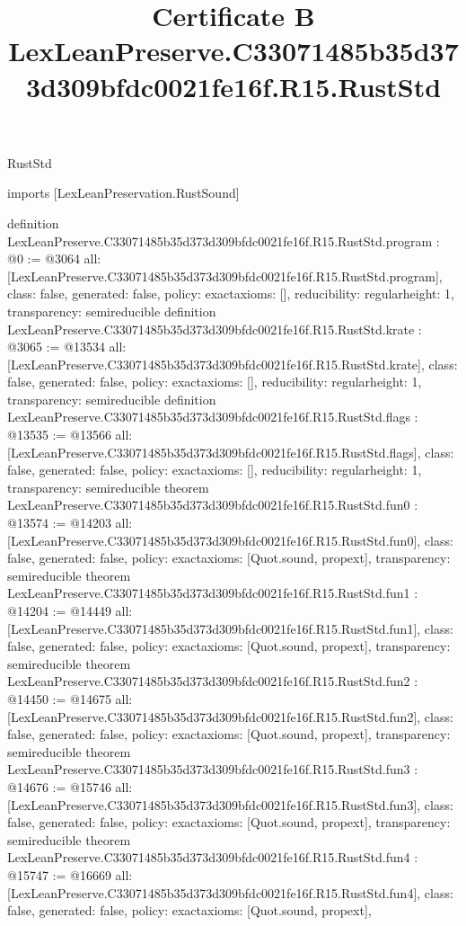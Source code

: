 \begin{lexlean}{RustStd}
\title{Certificate B LexLeanPreserve.C33071485b35d373d309bfdc0021fe16f.R15.RustStd}
\begin{coremodule}
imports [LexLeanPreservation.RustSound]

definition LexLeanPreserve.C33071485b35d373d309bfdc0021fe16f.R15.RustStd.program : @0 := @3064 {
  all: [LexLeanPreserve.C33071485b35d373d309bfdc0021fe16f.R15.RustStd.program],
  class: false,
  generated: false,
  policy: exact{axioms: []},
  reducibility: regular{height: 1},
  transparency: semireducible
}
definition LexLeanPreserve.C33071485b35d373d309bfdc0021fe16f.R15.RustStd.krate : @3065 := @13534 {
  all: [LexLeanPreserve.C33071485b35d373d309bfdc0021fe16f.R15.RustStd.krate],
  class: false,
  generated: false,
  policy: exact{axioms: []},
  reducibility: regular{height: 1},
  transparency: semireducible
}
definition LexLeanPreserve.C33071485b35d373d309bfdc0021fe16f.R15.RustStd.flags : @13535 := @13566 {
  all: [LexLeanPreserve.C33071485b35d373d309bfdc0021fe16f.R15.RustStd.flags],
  class: false,
  generated: false,
  policy: exact{axioms: []},
  reducibility: regular{height: 1},
  transparency: semireducible
}
theorem LexLeanPreserve.C33071485b35d373d309bfdc0021fe16f.R15.RustStd.fun0 : @13574 := @14203 {
  all: [LexLeanPreserve.C33071485b35d373d309bfdc0021fe16f.R15.RustStd.fun0],
  class: false,
  generated: false,
  policy: exact{axioms: [Quot.sound, propext]},
  transparency: semireducible
}
theorem LexLeanPreserve.C33071485b35d373d309bfdc0021fe16f.R15.RustStd.fun1 : @14204 := @14449 {
  all: [LexLeanPreserve.C33071485b35d373d309bfdc0021fe16f.R15.RustStd.fun1],
  class: false,
  generated: false,
  policy: exact{axioms: [Quot.sound, propext]},
  transparency: semireducible
}
theorem LexLeanPreserve.C33071485b35d373d309bfdc0021fe16f.R15.RustStd.fun2 : @14450 := @14675 {
  all: [LexLeanPreserve.C33071485b35d373d309bfdc0021fe16f.R15.RustStd.fun2],
  class: false,
  generated: false,
  policy: exact{axioms: [Quot.sound, propext]},
  transparency: semireducible
}
theorem LexLeanPreserve.C33071485b35d373d309bfdc0021fe16f.R15.RustStd.fun3 : @14676 := @15746 {
  all: [LexLeanPreserve.C33071485b35d373d309bfdc0021fe16f.R15.RustStd.fun3],
  class: false,
  generated: false,
  policy: exact{axioms: [Quot.sound, propext]},
  transparency: semireducible
}
theorem LexLeanPreserve.C33071485b35d373d309bfdc0021fe16f.R15.RustStd.fun4 : @15747 := @16669 {
  all: [LexLeanPreserve.C33071485b35d373d309bfdc0021fe16f.R15.RustStd.fun4],
  class: false,
  generated: false,
  policy: exact{axioms: [Quot.sound, propext]},
}
\end{coremodule}
\end{lexlean}
